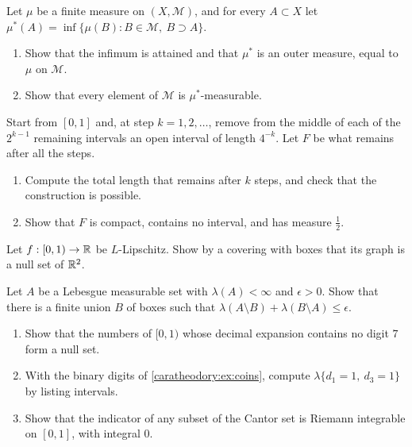 \begin{notechapter}
\begin{exercise}\label{caratheodory:exr:3}
Let $\mu$ be a finite measure on $(X, \mathcal M)$, and for every
$A\subset X$ let
$\mu^*(A) = \inf\{\mu(B) : B\in\mathcal M,\ B\supset A\}$.
\begin{enumerate}[nosep]
  \item Show that the infimum is attained and that $\mu^*$ is an outer
        measure, equal to $\mu$ on $\mathcal M$.
  \item Show that every element of $\mathcal M$ is $\mu^*$-measurable.
\end{enumerate}
\end{exercise}

\begin{exercise}\label{caratheodory:exr:4}
Start from $[0, 1]$ and, at step $k = 1, 2, \dots$, remove from the
middle of each of the $2^{k-1}$ remaining intervals an open interval
of length $4^{-k}$. Let $F$ be what remains after all the steps.
\begin{enumerate}[nosep]
  \item Compute the total length that remains after $k$ steps, and
        check that the construction is possible.
  \item Show that $F$ is compact, contains no interval, and has
        measure $\frac12$.
\end{enumerate}
\end{exercise}

\begin{exercise}\label{caratheodory:exr:5}
Let $f:[0, 1)\to\mathbb{R}$ be $L$-Lipschitz. Show by a covering with boxes
that its graph is a null set of $\mathbb{R}^2$.
\end{exercise}

\begin{exercise}\label{caratheodory:exr:6}
Let $A$ be a Lebesgue measurable set with $\lambda(A) < \infty$ and
$\epsilon > 0$. Show that there is a finite union $B$ of boxes such
that
$\lambda(A\setminus B) + \lambda(B\setminus A)\leq\epsilon$.
\end{exercise}

\begin{exercise}\label{caratheodory:exr:7}
\begin{enumerate}[nosep]
  \item Show that the numbers of $[0, 1)$ whose decimal expansion
        contains no digit $7$ form a null set.
  \item With the binary digits of \cref{caratheodory:ex:coins},
        compute $\lambda\{d_1 = 1,\ d_3 = 1\}$ by listing intervals.
  \item Show that the indicator of any subset of the Cantor set is
        Riemann integrable on $[0, 1]$, with integral $0$.
\end{enumerate}
\end{exercise}


\end{notechapter}
